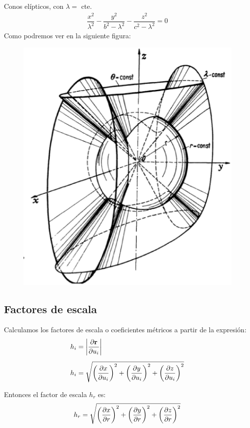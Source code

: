 Conos elípticos, con $\lambda=$ cte.
\begin{align*}
\dfrac{x^{2}}{\lambda^{2}} - \dfrac{y^{2}}{b^{2} - \lambda^{2}} - \dfrac{z^{2}}{c^{2} - \lambda^{2}} = 0
\end{align*}
Como podremos ver en la siguiente figura:
\begin{figure}[H]
   \centering
   \includegraphics[scale=0.5]{Imagenes/Sistema_Conico.eps}
\end{figure}

\subsection{Factores de escala}

Calculamos los factores de escala o coeficientes métricos a partir de la expresión:
\begin{align*}
h_{i} &= \abs{\pdv{\vb{r}}{u_{i}}} \\[0.5em]
h_{i} &= \sqrt{ \left( \pdv{x}{u_{i}} \right)^{2} + \left( \pdv{y}{u_{i}} \right)^{2} + \left( \pdv{z}{u_{i}} \right)^{2}}
\end{align*}

Entonces el factor de escala  $h_{r}$ es:
\begin{align*}
h_{r} = \sqrt{\left( \pdv{x}{r} \right)^{2} + \left( \pdv{y}{r} \right)^{2} + \left( \pdv{z}{r} \right)^{2}}
\end{align*}

